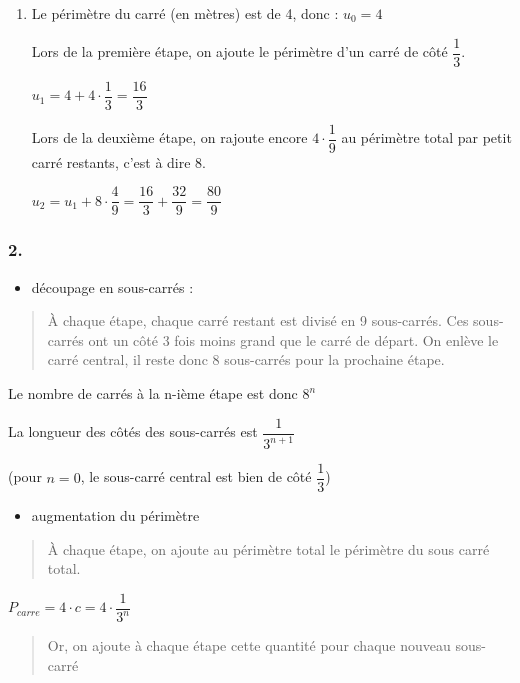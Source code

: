 \documentclass[]{scrartcl}
\providecommand{\tightlist}{%
  \setlength{\itemsep}{0pt}\setlength{\parskip}{0pt}}
\begin{document}
\begin{enumerate}
\def\labelenumi{\arabic{enumi}.}
\item
  Le périmètre du carré (en mètres) est de 4, donc : \(u_0 = 4\)

  Lors de la première étape, on ajoute le périmètre d'un carré de côté
  \(\dfrac{1}{3}\).

  \(u_1 = 4 + 4\cdot \dfrac{1}{3} = \dfrac{16}{3}\)

  Lors de la deuxième étape, on rajoute encore \(4\cdot\dfrac{1}{9}\) au
  périmètre total par petit carré restants, c'est à dire 8.

  \(u_2 = u_1 + 8 \cdot \dfrac{4}{9} = \dfrac{16}{3} + \dfrac{32}{9} = \dfrac{80}{9}\)
\end{enumerate}

\hypertarget{section-3}{%
\subsubsection{2.}\label{section-3}}

\begin{itemize}
\tightlist
\item
  découpage en sous-carrés :
\end{itemize}

\begin{quote}
À chaque étape, chaque carré restant est divisé en 9 sous-carrés. Ces
sous-carrés ont un côté 3 fois moins grand que le carré de départ. On
enlève le carré central, il reste donc 8 sous-carrés pour la prochaine
étape.
\end{quote}

Le nombre de carrés à la n-ième étape est donc \(8^n\)

La longueur des côtés des sous-carrés est \(\dfrac{1}{3^{n+1}}\)

(pour \(n=0\), le sous-carré central est bien de côté \(\dfrac{1}{3}\))

\begin{itemize}
\tightlist
\item
  augmentation du périmètre
\end{itemize}

\begin{quote}
À chaque étape, on ajoute au périmètre total le périmètre du sous carré
total.
\end{quote}

\(P_{carre} = 4\cdot c = 4\cdot \dfrac{1}{3^n}\)

\begin{quote}
Or, on ajoute à chaque étape cette quantité pour chaque nouveau
sous-carré
\end{quote}
\end{document}
